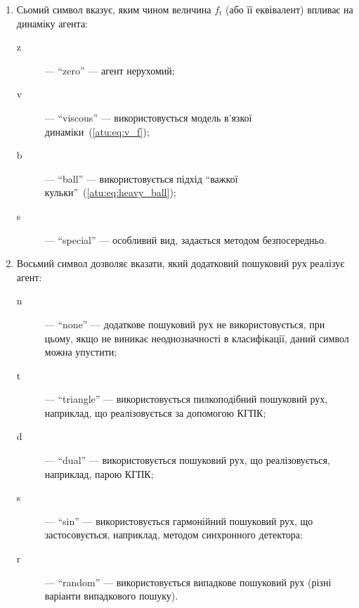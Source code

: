 \begin{enumerate}
\begin{description}
    \end{description}

  \item
    Сьомий символ
    вказує, яким чином величина $f_t$ (або її еквівалент) впливає на динаміку агента:
    \begin{description}

      \item[z]  --- ``zero'' ---
        агент нерухомий;

      \item[v] --- ``viscous'' ---
        використовується модель в'язкої динаміки~(\ref{atu:eq:v_f});

      \item[b] --- ``ball'' ---
        використовується підхід ``важкої кульки''~(\ref{atu:eq:heavy_ball});

      \item[s] --- ``special'' ---
        особливий вид, задається методом безпосередньо.

    \end{description}

  \item
    Восьмий символ дозволяє вказати,
    який додатковий пошуковий рух реалізує агент:
    \begin{description}

      \item[n]  --- ``none'' ---
        додаткове пошуковий рух не використовується, при цьому, якщо
        не виникає неоднозначності в класифікації, даний символ можна
        упустити;

      \item[t] --- ``triangle'' ---
        використовується пилкоподібний пошуковий рух, наприклад, що
        реалізовується за допомогою КГПК;

      \item[d] --- ``dual'' ---
        використовується пошуковий рух, що реалізовується, наприклад,
        парою КГПК;

      \item[s] --- ``sin'' ---
        використовується гармонійний пошуковий рух, що застосовується,
        наприклад, методом синхронного детектора;

      \item[r] --- ``random'' ---
        використовується випадкове пошуковий рух (різні варіанти
        випадкового пошуку).

    \end{description}



\end{enumerate}
